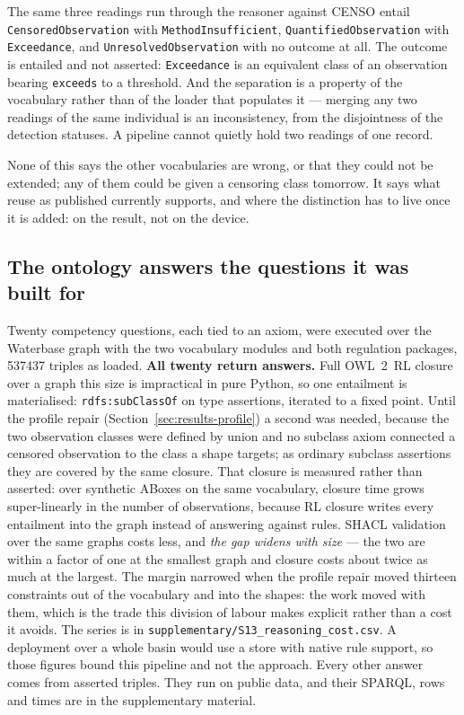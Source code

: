 The same three readings run through the reasoner against CENSO entail
\texttt{CensoredObservation} with \texttt{MethodInsufficient},
\texttt{QuantifiedObservation} with \texttt{Exceedance}, and
\texttt{UnresolvedObservation} with no outcome at all. The outcome is entailed
and not asserted: \texttt{Exceedance} is an equivalent class of an observation
bearing \texttt{exceeds} to a threshold. And the separation is a property of
the vocabulary rather than of the loader that populates it --- merging any two
readings of the same individual is an inconsistency, from the disjointness of
the detection statuses. A pipeline cannot quietly hold two readings of one
record.

None of this says the other vocabularies are wrong, or that they could not be
extended; any of them could be given a censoring class tomorrow. It says what
reuse as published currently supports, and where the distinction has to live
once it is added: on the result, not on the device.

\subsection{The ontology answers the questions it was built for}
\label{sec:results-cq}
Twenty competency questions, each tied to an axiom, were executed over the
Waterbase graph with the two vocabulary modules and both regulation packages,
\num{537437} triples as
loaded. \textbf{All twenty
return answers.} Full OWL~2~RL closure over a graph this size is impractical in
pure Python, so one entailment is materialised: \texttt{rdfs:subClassOf} on
type assertions, iterated to a fixed point. Until the profile repair
(Section~\ref{sec:results-profile}) a second was needed, because the two
observation classes were defined by union and no subclass axiom connected a
censored observation to the class a shape targets; as ordinary subclass
assertions they are covered by the same closure. That closure is measured
rather than asserted: over synthetic ABoxes on the same vocabulary, closure
time grows super-linearly in the number of observations, because RL closure
writes every entailment into the graph instead of answering against rules.
SHACL validation over the same graphs costs less, and \emph{the gap widens with
size} --- the two are within a factor of one at the smallest graph and closure
costs about twice as much at the largest.
The margin narrowed when the profile repair moved thirteen constraints out of
the vocabulary and into the shapes: the work moved with them, which is the
trade this division of labour makes explicit rather than a cost it avoids. The series
is in \texttt{supplementary/S13\_reasoning\_cost.csv}. A deployment over a
whole basin would use a store with native rule support, so those figures bound
this pipeline and not the approach. Every other answer comes from asserted triples. They run on public
data, and their SPARQL, rows and times are in the supplementary material.

